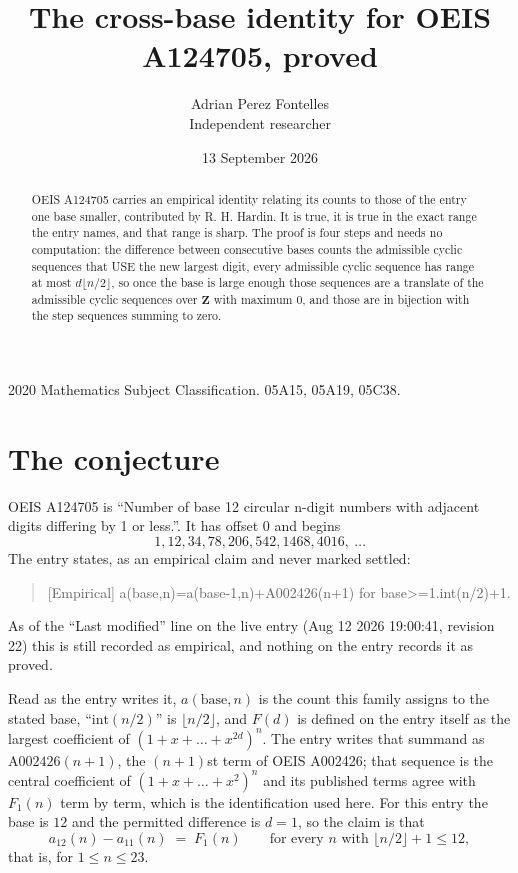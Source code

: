 \documentclass[11pt,a4paper]{article}
\title{The cross-base identity for OEIS A124705, proved}
\author{Adrian Perez Fontelles\\ \small Independent researcher}
\date{13 September 2026}
\theoremstyle{plain}
\theoremstyle{definition}
\begin{document}
\maketitle

\begin{abstract}
OEIS A124705 carries an empirical identity relating its counts to those of the entry one base
smaller, contributed by R. H. Hardin. It is true, it is true in the exact range the entry
names, and that range is sharp. The proof is four steps and needs no computation: the
difference between consecutive bases counts the admissible cyclic sequences that USE the new
largest digit, every admissible cyclic sequence has range at most $d\lfloor n/2\rfloor$, so
once the base is large enough those sequences are a translate of the admissible cyclic
sequences over $\mathbf{Z}$ with maximum $0$, and those are in bijection with the step
sequences summing to zero.
\end{abstract}

\noindent\small 2020 Mathematics Subject Classification. 05A15, 05A19, 05C38.\normalsize

\section{The conjecture}

OEIS A124705 is ``Number of base 12 circular n-digit numbers with adjacent digits differing by 1 or less.''. It has offset $0$ and begins
\[
1, 12, 34, 78, 206, 542, 1468, 4016,\ \dots
\]
The entry states, as an empirical claim and never marked settled:
\begin{quote}
[Empirical] a(base,n)=a(base-1,n)+A002426(n+1) for base>=1.int(n/2)+1.
\end{quote}
As of the ``Last modified'' line on the live entry (Aug 12 2026 19:00:41, revision 22)
this is still recorded as empirical, and nothing on the entry records it as proved.

Read as the entry writes it, $a(\mathrm{base},n)$ is the count this family assigns to the
stated base, ``$\mathrm{int}(n/2)$'' is $\lfloor n/2\rfloor$, and $F(d)$ is defined on the
entry itself as the largest coefficient of $(1+x+\dots+x^{2d})^{n}$. The entry writes that summand as $\mathrm{A002426}(n+1)$, the $(n+1)$st term of OEIS A002426; that sequence is the central coefficient of $(1+x+\dots+x^{2})^{n}$ and its published terms agree with $F_{1}(n)$ term by term, which is the identification used here. For this entry
the base is $12$ and the permitted difference is $d=1$, so the claim is that
\[
a_{12}(n)-a_{11}(n)\;=\;F_{1}(n)
\qquad\text{for every } n \text{ with } \lfloor n/2\rfloor+1\le12,
\]
that is, for $1\le n\le23$.
\end{document}
